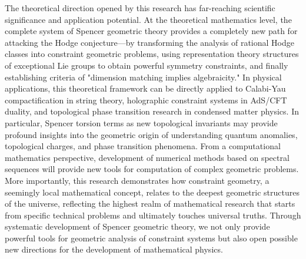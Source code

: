 \documentclass[a4paper,12pt]{extarticle}
\theoremstyle{definition}
\begin{document}
The theoretical direction opened by this research has far-reaching scientific significance and application potential. At the theoretical mathematics level, the complete system of Spencer geometric theory provides a completely new path for attacking the Hodge conjecture—by transforming the analysis of rational Hodge classes into constraint geometric problems, using representation theory structures of exceptional Lie groups to obtain powerful symmetry constraints, and finally establishing criteria of "dimension matching implies algebraicity." In physical applications, this theoretical framework can be directly applied to Calabi-Yau compactification in string theory, holographic constraint systems in AdS/CFT duality, and topological phase transition research in condensed matter physics. In particular, Spencer torsion terms as new topological invariants may provide profound insights into the geometric origin of understanding quantum anomalies, topological charges, and phase transition phenomena. From a computational mathematics perspective, development of numerical methods based on spectral sequences will provide new tools for computation of complex geometric problems. More importantly, this research demonstrates how constraint geometry, a seemingly local mathematical concept, relates to the deepest geometric structures of the universe, reflecting the highest realm of mathematical research that starts from specific technical problems and ultimately touches universal truths. Through systematic development of Spencer geometric theory, we not only provide powerful tools for geometric analysis of constraint systems but also open possible new directions for the development of mathematical physics.



\end{document}

